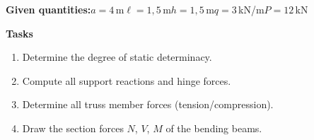 \documentclass[a4paper,11pt]{article}
\begin{document}
\textbf{Given quantities:}\quad $a=4$\,m\quad $\ell=1,5$\,m\quad $h=1,5$\,m\quad $q=3$\,kN/m\quad $P=12$\,kN
\par\medskip
\textbf{Tasks}\par
\begin{enumerate}[label=\textbf{\arabic*.}]
  \item Determine the degree of static determinacy.
  \item Compute all support reactions and hinge forces.
  \item Determine all truss member forces (tension/compression).
  \item Draw the section forces $N$, $V$, $M$ of the bending beams.
\end{enumerate}
\end{document}
